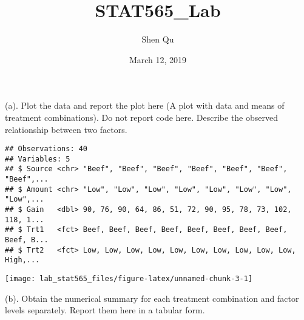 \documentclass[]{article}
\title{STAT565\_Lab}
\author{Shen Qu}
\date{March 12, 2019}
\begin{document}
\maketitle

(a).
\textcolor[rgb]{0.5,0.5,0.5}{Plot the data and report the plot here (A plot with data and means of treatment combinations). Do not report code here. Describe the observed relationship between two factors.}

\begin{verbatim}
## Observations: 40
## Variables: 5
## $ Source <chr> "Beef", "Beef", "Beef", "Beef", "Beef", "Beef", "Beef",...
## $ Amount <chr> "Low", "Low", "Low", "Low", "Low", "Low", "Low", "Low",...
## $ Gain   <dbl> 90, 76, 90, 64, 86, 51, 72, 90, 95, 78, 73, 102, 118, 1...
## $ Trt1   <fct> Beef, Beef, Beef, Beef, Beef, Beef, Beef, Beef, Beef, B...
## $ Trt2   <fct> Low, Low, Low, Low, Low, Low, Low, Low, Low, Low, High,...
\end{verbatim}

\texttt{[image: lab\_stat565\_files/figure-latex/unnamed-chunk-3-1]}

(b).
\textcolor[rgb]{0.5,0.5,0.5}{Obtain the numerical summary for each treatment combination and factor levels separately. Report them here in a tabular form.}
\end{document}
